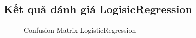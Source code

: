 \documentclass[12pt,a4paper,oneside]{book}
\begin{document}
	\subsection{Kết quả đánh giá LogisicRegression}
		\begin{figure}[H]
			\hfill
			\hfill
			\caption{Confusion Matrix LogisticRegression} 
		\end{figure}
\end{document}
